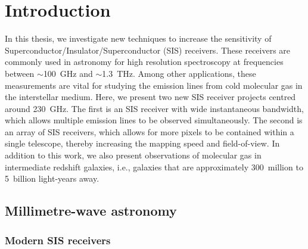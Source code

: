 
\chapter{Introduction}




In this thesis, we investigate new techniques to increase the sensitivity of Superconductor/Insulator/Superconductor (SIS) receivers. These receivers are commonly used in astronomy for high resolution spectroscopy at frequencies between ${\sim}$100~GHz and ${\sim}$1.3~THz. Among other applications, these measurements are vital for studying the emission lines from cold molecular gas in the interstellar medium. Here, we present two new SIS receiver projects centred around 230~GHz. The first is an SIS receiver with wide instantaneous bandwidth, which allows multiple emission lines to be observed simultaneously. The second is an array of SIS receivers, which allows for more pixels to be contained within a single telescope, thereby increasing the mapping speed and field-of-view. In addition to this work, we also present observations of molecular gas in intermediate redshift galaxies, i.e., galaxies that are approximately 300~million to 5~billion light-years away.




\section{Millimetre-wave astronomy}\label{sec:mmwave-astronomy}

\lipsum[2-4]

\subsection*{Modern SIS receivers}

